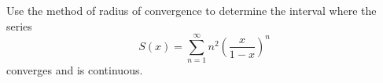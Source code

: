 \begin{exercise}
  \label{ex:hw06:composed-power-series}
  Use the method of radius of convergence to determine the interval where
  the series
  \[
    S(x)=\sum_{n=1}^{\infty}n^2\left(\frac{x}{1-x}\right)^n
  \]
  converges and is continuous.
\end{exercise}
